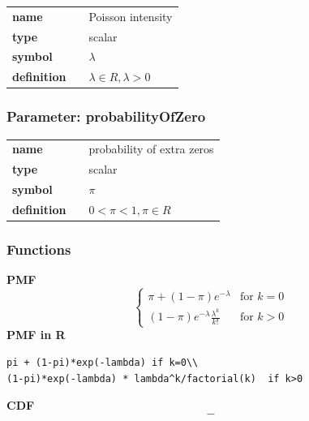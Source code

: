 \documentclass{article}
\begin{document}
\noindent\begin{tabular}{p{2cm}cl}
\textbf{name} & & Poisson intensity \\
\textbf{type} & & scalar \\
\textbf{symbol} & & $\lambda$  \\
\textbf{definition} & & $\lambda \in R, \lambda > 0$
\end{tabular}
\subsubsection*{Parameter: probabilityOfZero}

\noindent\begin{tabular}{p{2cm}cl}
\textbf{name} & & probability of extra zeros \\
\textbf{type} & & scalar \\
\textbf{symbol} & & $\pi$  \\
\textbf{definition} & & $0<\pi<1, \pi \in  R$
\end{tabular}
\subsubsection*{Functions}

\smallskip \noindent \hspace{.2cm} \textbf{PMF} 
\begin{equation*}\begin{cases}
\pi + (1-\pi) e^{-\lambda}& \text{for } k = 0 \\ 
(1-\pi) e^{-\lambda} \frac{\lambda^k}{k!} & \text{for } k > 0
\end{cases}\end{equation*}
\smallskip \noindent \hspace{.2cm} \textbf{PMF in R}  
\begin{verbatim}pi + (1-pi)*exp(-lambda) if k=0\\
(1-pi)*exp(-lambda) * lambda^k/factorial(k)  if k>0\end{verbatim}
\smallskip \noindent \hspace{.2cm} \textbf{CDF} 
\begin{equation*}-\end{equation*}
\smallskip
\end{document}
